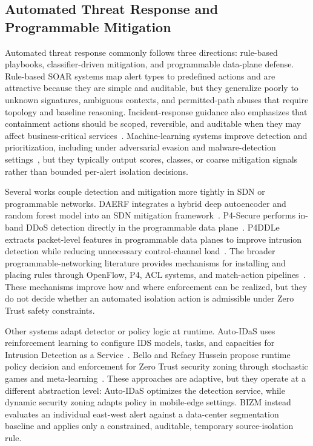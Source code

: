 \documentclass[final,5p]{elsarticle}
\begin{document}
\subsection{Automated Threat Response and Programmable Mitigation}
\label{sec:rw_threat_response}

Automated threat response commonly follows three directions: rule-based playbooks, classifier-driven mitigation, and programmable data-plane defense. Rule-based SOAR systems map alert types to predefined actions and are attractive because they are simple and auditable, but they generalize poorly to unknown signatures, ambiguous contexts, and permitted-path abuses that require topology and baseline reasoning. Incident-response guidance also emphasizes that containment actions should be scoped, reversible, and auditable when they may affect business-critical services~\cite{cichonski2012incident,nelson2025incident,belhaj2023cybersecurityautomation}. Machine-learning systems improve detection and prioritization, including under adversarial evasion and malware-detection settings~\cite{jAA-IDS25,cAPELID-ATH25,jMDOB25,jHybridWSD23}, but they typically output scores, classes, or coarse mitigation signals rather than bounded per-alert isolation decisions.

Several works couple detection and mitigation more tightly in SDN or programmable networks. DAERF integrates a hybrid deep autoencoder and random forest model into an SDN mitigation framework~\cite{mhamdi2024daerf}. P4-Secure performs in-band DDoS detection directly in the programmable data plane~\cite{manocchio2025p4secure}. P4DDLe extracts packet-level features in programmable data planes to improve intrusion detection while reducing unnecessary control-channel load~\cite{doriguzzi2024packet}. The broader programmable-networking literature provides mechanisms for installing and placing rules through OpenFlow, P4, ACL systems, and match-action pipelines~\cite{mckeown2008openflow,bosshart2014p4,farhady2015software,ghasemi2022portcatcher}. These mechanisms improve how and where enforcement can be realized, but they do not decide whether an automated isolation action is admissible under Zero Trust safety constraints.

Other systems adapt detector or policy logic at runtime. Auto-IDaS uses reinforcement learning to configure IDS models, tasks, and capacities for Intrusion Detection as a Service~\cite{lin2024autoidas}. Bello and Refaey Hussein propose runtime policy decision and enforcement for Zero Trust security zoning through stochastic games and meta-learning~\cite{bello2025dynamic}. These approaches are adaptive, but they operate at a different abstraction level: Auto-IDaS optimizes the detection service, while dynamic security zoning adapts policy in mobile-edge settings. BIZM instead evaluates an individual east-west alert against a data-center segmentation baseline and applies only a constrained, auditable, temporary source-isolation rule.
\end{document}
